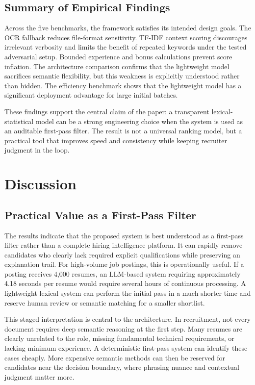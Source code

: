 \documentclass[conference]{IEEEtran}
\begin{document}
\subsection{Summary of Empirical Findings}
Across the five benchmarks, the framework satisfies its intended design goals. The OCR fallback reduces file-format sensitivity. TF-IDF context scoring discourages irrelevant verbosity and limits the benefit of repeated keywords under the tested adversarial setup. Bounded experience and bonus calculations prevent score inflation. The architecture comparison confirms that the lightweight model sacrifices semantic flexibility, but this weakness is explicitly understood rather than hidden. The efficiency benchmark shows that the lightweight model has a significant deployment advantage for large initial batches.

These findings support the central claim of the paper: a transparent lexical-statistical model can be a strong engineering choice when the system is used as an auditable first-pass filter. The result is not a universal ranking model, but a practical tool that improves speed and consistency while keeping recruiter judgment in the loop.

\section{Discussion}
\subsection{Practical Value as a First-Pass Filter}
The results indicate that the proposed system is best understood as a first-pass filter rather than a complete hiring intelligence platform. It can rapidly remove candidates who clearly lack required explicit qualifications while preserving an explanation trail. For high-volume job postings, this is operationally useful. If a posting receives 4,000 resumes, an LLM-based system requiring approximately 4.18 seconds per resume would require several hours of continuous processing. A lightweight lexical system can perform the initial pass in a much shorter time and reserve human review or semantic matching for a smaller shortlist.

This staged interpretation is central to the architecture. In recruitment, not every document requires deep semantic reasoning at the first step. Many resumes are clearly unrelated to the role, missing fundamental technical requirements, or lacking minimum experience. A deterministic first-pass system can identify these cases cheaply. More expensive semantic methods can then be reserved for candidates near the decision boundary, where phrasing nuance and contextual judgment matter more.
\end{document}
